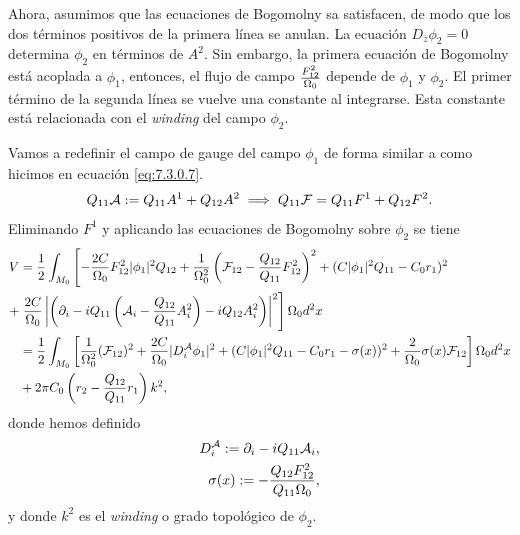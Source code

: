 Ahora, asumimos que las ecuaciones de Bogomolny sa satisfacen, de modo que los dos términos positivos de la primera línea se anulan. La ecuación $D_{\overline z}\phi_2=0$ determina $\phi_2$ en términos de $A^2$. Sin embargo, la primera ecuación de Bogomolny está acoplada a $\phi_1$, entonces, el flujo de campo $\frac{F_{12}^2}{\Omega_0}$ depende de $\phi_1$ y $\phi_2$. El primer término de la segunda línea se vuelve una constante al integrarse. Esta constante está relacionada con el \emph{winding} del campo $\phi_2$.

Vamos a redefinir el campo de gauge del campo $\phi_1$ de forma similar a como hicimos en ecuación \eqref{eq:7.3.0.7}.
\begin{align}
	Q_{11}\mathcal{A} := Q_{11}A^1+Q_{12}A^2\implies Q_{11}\mathcal{F} = Q_{11}F^1+Q_{12}F^2.
\end{align}
Eliminando $F^1$ y aplicando las ecuaciones de Bogomolny sobre $\phi_2$ se tiene
\begin{align}
	V & = \frac{1}{2}\int_{M_0}\left[-\frac{2C}{\Omega_0}F_{12}^2|\phi_1|^2Q_{12}+\frac{1}{\Omega_0^2}\left(\mathcal{F}_{12}-\frac{Q_{12}}{Q_{11}}F_{12}^2\right)^2+(C|\phi_1|^2Q_{11}-C_0r_1)^2\right.\nonumber            \\
	+ & \left.\frac{2C}{\Omega_0}\left|\left(\partial_i-iQ_{11}\left(\mathcal{A}_i-\frac{Q_{12}}{Q_{11}}A_i^2\right)-iQ_{12}A_i^2\right)\right|^2\right]\Omega_0 d^2x\nonumber                                                 \\
	  & =\frac{1}{2}\int_{M_0}\left[\frac{1}{\Omega_0^2}(\mathcal{F}_{12})^2+\frac{2C}{\Omega_0}|D_i^{\mathcal{A}}\phi_1|^2+(C|\phi_1|^2Q_{11}-C_0r_1-\sigma(x))^2+\frac{2}{\Omega_0}\sigma(x)\mathcal{F}_{12}\right]\Omega_0 d^2x\nonumber \\
	  & +2\pi C_0\left(r_2-\frac{Q_{12}}{Q_{11}}r_1\right)k^2,
\end{align}
donde hemos definido
\begin{align}
	D_i^{\mathcal{A}}:=\partial_i-iQ_{11}\mathcal{A}_i, \\
	\sigma(x) := -\frac{Q_{12}F_{12}^2}{Q_{11}\Omega_0},
\end{align}
y donde $k^2$ es el \emph{winding} o grado topológico de $\phi_2$.


